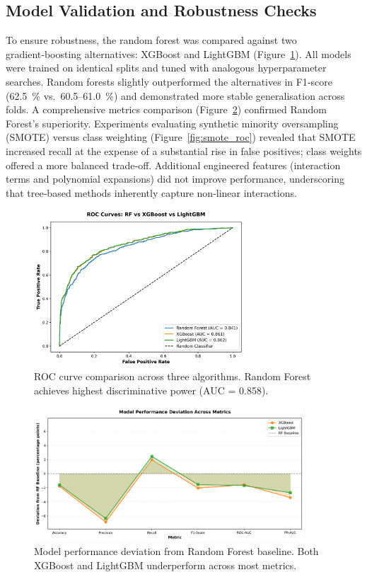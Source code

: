 \documentclass[12pt]{article}
\begin{document}
\subsection{Model Validation and Robustness Checks}
To ensure robustness, the random forest was compared against two gradient‑boosting alternatives: XGBoost and LightGBM (Figure~\ref{fig:model_comparison}).  All models were trained on identical splits and tuned with analogous hyperparameter searches.  Random forests slightly outperformed the alternatives in F1‑score (62.5~\% vs.\ 60.5–61.0~\%) and demonstrated more stable generalisation across folds.  A comprehensive metrics comparison (Figure~\ref{fig:metrics_comparison}) confirmed Random Forest's superiority.  Experiments evaluating synthetic minority oversampling (SMOTE) versus class weighting (Figure~\ref{fig:smote_roc}) revealed that SMOTE increased recall at the expense of a substantial rise in false positives; class weights offered a more balanced trade‑off.  Additional engineered features (interaction terms and polynomial expansions) did not improve performance, underscoring that tree‑based methods inherently capture non‑linear interactions.

\begin{figure}[H]
\centering
\includegraphics[width=0.7\textwidth]{img/21_model_comparison_roc.png}
\caption{ROC curve comparison across three algorithms. Random Forest achieves highest discriminative power (AUC = 0.858).}
\label{fig:model_comparison}
\end{figure}

\begin{figure}[H]
\centering
\includegraphics[width=0.9\textwidth]{img/24_model_comparison_metrics.png}
\caption{Model performance deviation from Random Forest baseline. Both XGBoost and LightGBM underperform across most metrics.}
\label{fig:metrics_comparison}
\end{figure}
\end{document}
